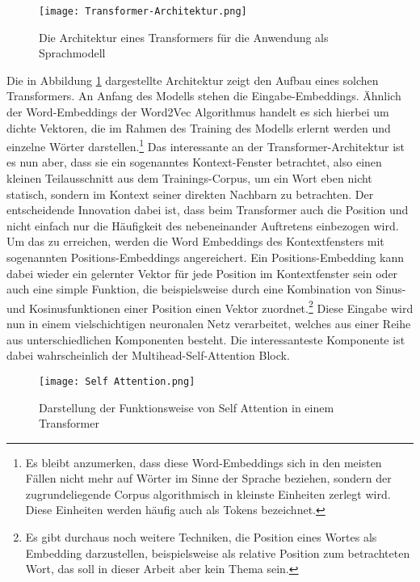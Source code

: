 \begin{figure}[H]
    \centering
    \texttt{[image: Transformer-Architektur.png]}
    \caption{Die Architektur eines Transformers für die Anwendung als Sprachmodell \parencite{jurafsky_martin_2020}}
    \label{Transformer}
\end{figure}

Die in Abbildung \ref{Transformer} dargestellte Architektur zeigt den Aufbau eines solchen Transformers. An Anfang des Modells stehen die Eingabe-Embeddings. Ähnlich der Word-Embeddings der Word2Vec Algorithmus handelt es sich hierbei um dichte Vektoren, die im Rahmen des Training des Modells erlernt werden und einzelne Wörter darstellen.\footnote{Es bleibt anzumerken, dass diese Word-Embeddings sich in den meisten Fällen nicht mehr auf Wörter im Sinne der Sprache beziehen, sondern der zugrundeliegende Corpus algorithmisch in kleinste Einheiten zerlegt wird. Diese Einheiten werden häufig auch als Tokens bezeichnet. } Das interessante an der Transformer-Architektur ist es nun aber, dass sie ein sogenanntes Kontext-Fenster betrachtet, also einen kleinen Teilausschnitt aus dem Trainings-Corpus, um ein Wort eben nicht statisch, sondern im Kontext seiner direkten Nachbarn zu betrachten. Der entscheidende Innovation dabei ist, dass beim Transformer auch die Position und nicht einfach nur die Häufigkeit des nebeneinander Auftretens einbezogen wird. Um das zu erreichen, werden die Word Embeddings des Kontextfensters mit sogenannten Positions-Embeddings angereichert. Ein Positions-Embedding kann dabei wieder ein gelernter Vektor für jede Position im Kontextfenster sein oder auch eine simple Funktion, die beispielsweise durch eine Kombination von Sinus- und Kosinusfunktionen einer Position einen Vektor zuordnet.\footnote{Es gibt durchaus noch weitere Techniken, die Position eines Wortes als Embedding darzustellen, beispielsweise als relative Position zum betrachteten Wort, das soll in dieser Arbeit aber kein Thema sein. } Diese Eingabe wird nun in einem vielschichtigen neuronalen Netz verarbeitet, welches aus einer Reihe aus unterschiedlichen Komponenten besteht. Die interessanteste Komponente ist dabei wahrscheinlich der Multihead-Self-Attention Block.\\

\begin{figure}[H]
    \centering
    \texttt{[image: Self Attention.png]}
    \caption{Darstellung der Funktionsweise von Self Attention in einem Transformer}
    \label{SelfAttention}
\end{figure}

